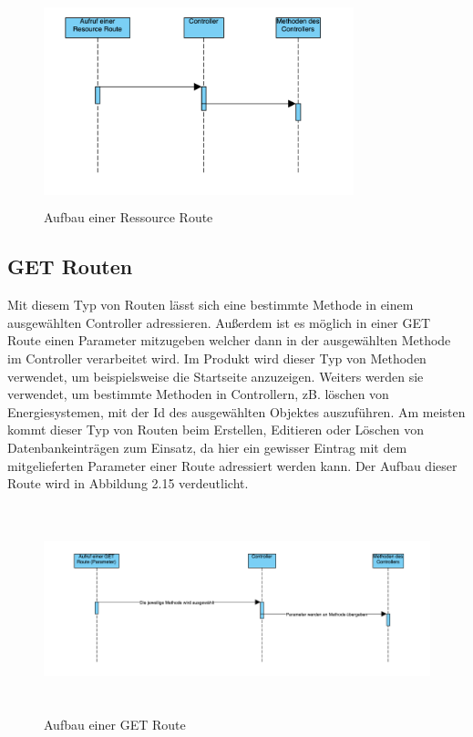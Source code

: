 \begin{figure}[h]
	\centering
	\includegraphics[height=6cm,width=9cm]{images/ResourceRoute}
	\caption{Aufbau einer Ressource Route}
	\label{fig:ResourceRoute}
\end{figure}

\subsection{GET Routen}
Mit diesem Typ von Routen lässt sich eine bestimmte Methode in einem ausgewählten Controller adressieren. Außerdem ist es möglich in einer GET Route einen Parameter mitzugeben welcher dann in der ausgewählten Methode im Controller verarbeitet wird. Im Produkt wird dieser Typ von Methoden verwendet, um beispielsweise die Startseite anzuzeigen. Weiters werden sie verwendet, um bestimmte Methoden in Controllern, zB. löschen von Energiesystemen, mit der Id des ausgewählten Objektes auszuführen. Am meisten kommt dieser Typ von Routen beim Erstellen, Editieren oder Löschen von Datenbankeinträgen zum Einsatz, da hier ein gewisser Eintrag mit dem mitgelieferten Parameter einer Route adressiert werden kann. Der Aufbau dieser Route wird in Abbildung 2.15 verdeutlicht.


\begin{figure}[h]
	\centering
	\includegraphics[height=6cm,width=16cm]{images/GETRoute}
	\caption{Aufbau einer GET Route}
	\label{fig:GETRoute}
\end{figure}

